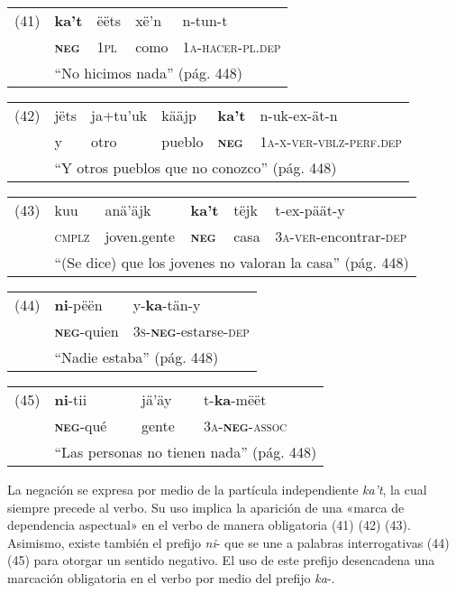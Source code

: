 {\setmainfont{Charis SIL} 

\begin{tabular}{lllll}
(41) & \textbf{ka't} & ëëts & xë'n & n-tun-t \\
& \textsc{\textbf{neg}} & \textsc{1pl} & como & \textsc{1a-hacer-pl.dep} \\
& \multicolumn{4}{l}{``No hicimos nada'' (pág. 448)}
\end{tabular} \vspace{0.3cm}

\begin{tabular}{llllll}
(42) & jëts & ja+tu'uk & kääjp & \textbf{ka't} & n-uk-ex-ät-n \\
& y & otro & pueblo & \textsc{\textbf{neg}} & \textsc{1a-x-ver-vblz-perf.dep} \\
& \multicolumn{5}{l}{``Y otros pueblos que no conozco'' (pág. 448)}
\end{tabular} \vspace{0.3cm}

\begin{tabular}{llllll}
(43) & kuu & anä'äjk & \textbf{ka't} & tëjk & t-ex-päät-y \\
& \textsc{cmplz} & joven.gente & \textsc{\textbf{neg}} & casa & \textsc{3a-ver}-encontrar-\textsc{dep} \\
& \multicolumn{5}{l}{``(Se dice) que los jovenes no valoran la casa'' (pág. 448)}
\end{tabular} \vspace{0.3cm}

\begin{tabular}{lll}
(44) & \textbf{ni}-pëën & y-\textbf{ka}-tän-y \\
& \textsc{\textbf{neg}}-quien & \textsc{3s-\textbf{neg}}-estarse-\textsc{dep} \\
& \multicolumn{2}{l}{``Nadie estaba'' (pág. 448)}
\end{tabular} \vspace{0.5cm}

\begin{tabular}{llll}
(45) & \textbf{ni}-tii & jä'äy & t-\textbf{ka}-mëët \\
& \textsc{\textbf{neg}}-qué & gente & \textsc{3a-\textbf{neg}-assoc} \\
& \multicolumn{3}{l}{``Las personas no tienen nada'' (pág. 448)}
\end{tabular} \vspace{0.5cm}

}

La negación se expresa por medio de la partícula independiente {\setmainfont{Charis SIL} \textit{ka't}}, la cual siempre precede al verbo. Su uso implica la aparición de una «marca de dependencia aspectual» \textcolor{MidnightBlue}{\citep{mixe}} en el verbo de manera obligatoria (41) (42) (43). Asimismo, existe también el prefijo {\setmainfont{Charis SIL} \textit{ni}-} que se une a palabras interrogativas (44) (45) para otorgar un sentido negativo. El uso de este prefijo desencadena una marcación obligatoria en el verbo por medio del prefijo {\setmainfont{Charis SIL} \textit{ka}-}.